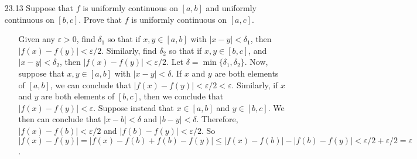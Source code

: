 \documentclass[12pt]{article}
\begin{document}
\begin{enumerate}
\begin{enumerate}
\item[23.13] Suppose that $f$ is uniformly continuous on $[a, b]$ and uniformly continuous on $[b, c]$. Prove that $f$ is uniformly continuous on $[a, c]$.
\begin{enumerate}
\item[] Given any $\varepsilon > 0$, find $\delta_1$ so that if $x, y \in [a, b]$ 
with $|x - y| < \delta_1$, then $|f(x) - f(y)| < \varepsilon /2$. Similarly, find
$\delta_2$ so that if $x, y \in [b, c]$, and $|x - y| < \delta_2$, then 
$|f(x) - f(y)| < \varepsilon /2$. Let $\delta = \min \{\delta_1, \delta_2 \}$.
Now, suppose that $x, y \in [a, b]$ with $|x - y| < \delta$. If $x$ and $y$ are both
elements of $[a, b]$, we can conclude that $|f(x) - f(y)| < \varepsilon /2 < \varepsilon$.
Similarly, if $x$ and $y$ are both elements of $[b, c]$, then we conclude that
$|f(x) - f(y)| < \varepsilon$.
Suppose instead that $x \in [a, b]$ and $y \in [b, c]$. We then can conclude
that $|x - b| < \delta$ and $|b - y| < \delta$. Therefore, 
$|f(x) - f(b)| < \varepsilon /2$ and $|f(b) - f(y)| < \varepsilon /2$. So 
$|f(x) - f(y)| = |f(x) - f(b) + f(b) - f(y)| \leq |f(x) - f(b)| - |f(b) - f(y)|
< \varepsilon /2 + \varepsilon /2 = \varepsilon$.
\end{enumerate}
\end{enumerate}
\end{enumerate}
\end{document}
